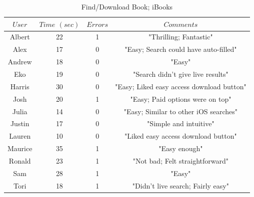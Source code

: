 \documentclass[11pt, oneside]{article}
\begin{document}
\begin{table}[!hbt]
\begin{center}
\caption{Find/Download Book; iBooks}
\label{tab:task3learnKindle}
\begin{tabular}{|c|c|c|c|}
\hline
$User$ & $Time$ $(sec)$ & $Errors$ & $Comments$\\
\hline
Albert & 22 & 1 & "Thrilling; Fantastic"\\
\hline
Alex & 17 & 0 & "Easy; Search could have auto-filled"\\
\hline
Andrew & 18 & 0 & "Easy"\\
\hline
Eko & 19 & 0 & "Search didn't give live results"\\
\hline
Harris & 30 & 0 & "Easy; Liked easy access download button"\\
\hline
Josh & 20 & 1 & "Easy; Paid options were on top"\\
\hline
Julia & 14 & 0 & "Easy; Similar to other iOS searches"\\
\hline
Justin & 17 & 0 & "Simple and intuitive"\\
\hline
Lauren & 10 & 0 & "Liked easy access download button"\\
\hline
Maurice & 35 & 1 & "Easy enough"\\
\hline
Ronald & 23 & 1 & "Not bad; Felt straightforward"\\
\hline
Sam & 28 & 1 & "Easy"\\
\hline
Tori & 18 & 1 & "Didn't live search; Fairly easy"\\
\hline
\end{tabular}
\end{center}
\end{table}
\end{document}
